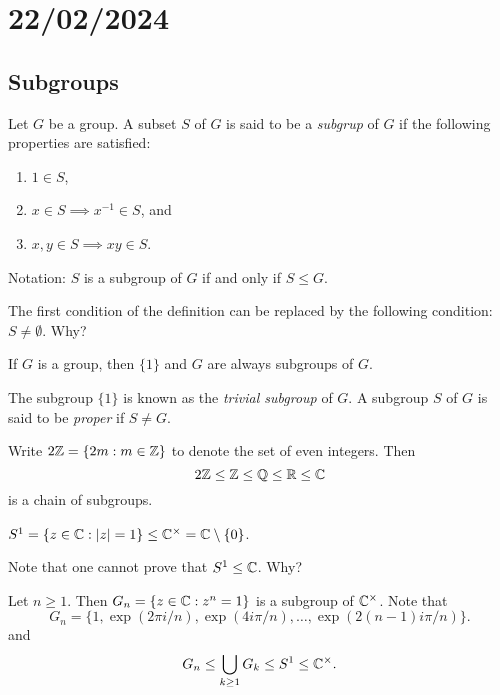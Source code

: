 \section{22/02/2024}

\subsection{Subgroups}

\begin{definition}
    Let $G$ be a group. 
        A subset $S$ of $G$ is said to be a \emph{subgrup} of $G$ 
        if the following properties are satisfied:
        \begin{enumerate}
                \item $1\in S$,
                \item $x\in S\implies x^{-1}\in S$, and 
                \item $x,y\in S\implies xy\in S$.
        \end{enumerate}
        Notation: $S$ is a subgroup of $G$ if and only if $S\leq G$.
\end{definition}

The first condition of the definition can be replaced by
the following condition: $S\ne\emptyset$. Why? 

\begin{example}
    If $G$ is a group, then 
    $\{1\}$ and $G$ are always subgroups of $G$. 
\end{example}

The subgroup $\{1\}$ is known as the \emph{trivial subgroup} of $G$. 
A subgroup $S$ of $G$ is said to be \emph{proper} if $S\ne G$. 

\begin{example}
Write $2\mathbb{Z}=\{2m:m\in\mathbb{Z}\}$ to denote the set of even integers. Then 
\[
2\mathbb{Z}\leq\mathbb{Z}\leq\mathbb{Q}\leq\mathbb{R}\leq\mathbb{C}
\]
is a chain of subgroups. 
\end{example}

\begin{example}
$S^1=\{z\in\mathbb{C}:|z|=1\}\leq\mathbb{C}^\times=\mathbb{C}\setminus\{0\}$.
\end{example}

Note that one cannot prove that $S^1\leq\mathbb{C}$. Why?

\begin{example}
Let $n\geq1$. Then $G_n=\{z\in\mathbb{C}:z^
n=1\}$ is a subgroup of $\mathbb{C}^\times$. 
Note that
\[
G_n=\{1,\exp(2\pi i/n),\exp(4i\pi/n),\dots,\exp(2(n-1)i\pi/n)\}.
\]
and 
\[
G_n\leq\bigcup_{k\geq1}G_k\leq S^1\leq\mathbb{C}^\times.
\]
\end{example}

